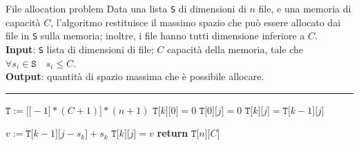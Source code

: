 \documentclass[a4paper, 12pt]{report}
\begin{document}
    \begin{framedalgo}[label={fileallocation}]{File allocation problem}
        Data una lista \texttt{S} di dimensioni di $n$ file, e una memoria di capacità $C$, l'algoritmo restituisce il massimo spazio che può essere allocato dai file in \texttt{S} sulla memoria; inoltre, i file hanno tutti dimensione inferiore a $C$.\\
        \textbf{Input}: \texttt{S} lista di dimensioni di file; $C$ capacità della memoria, tale che $\forall s_i \in \texttt{S} \quad s_i \le C$.\\
        \textbf{Output}: quantità di spazio massima che è possibile allocare.

        \hrule
        \begin{algorithmic}[1]
                \State $\texttt{T} := \texttt{[[}-1\texttt{]} * (C + 1) \texttt{]} * (n + 1)$
                 
                    \State $\texttt{T[} k\texttt{][}0\texttt{]} = 0$ 
                \EndFor
                 
                    \State $\texttt{T[} 0\texttt{][}j\texttt{]} = 0$ 
                \EndFor
                        \State $\texttt{T[}k\texttt{][}j\texttt{]} = \texttt{T[}k -1 \texttt{][}j\texttt{]}$ 

                        \State $v := \texttt{T[}k-1\texttt{][}j-s_k\texttt{]} + s_k$
                            \State $\texttt{T[}k\texttt{][}j\texttt{]} = v$
                        \EndIf
                    \EndFor
                \EndFor
                \State \textbf{return} $\texttt{T[}n\texttt{][}C\texttt{]}$
            \EndFunction
        \end{algorithmic}
    \end{framedalgo}
\end{document}
